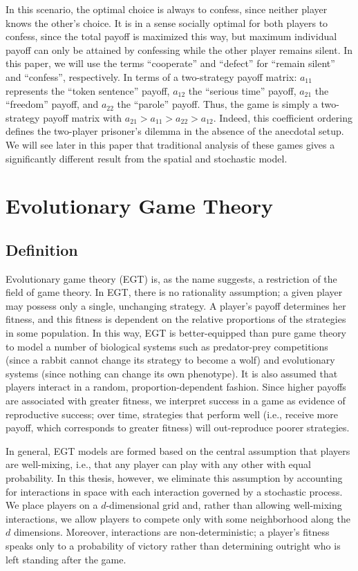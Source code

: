 \documentclass[notitlepage,reqno]{amsart}
\begin{document}
In this scenario, the optimal choice is always to confess, since
neither player knows the other's choice. It is in a sense socially
optimal for both players to confess, since the total payoff is
maximized this way, but maximum individual payoff can only be attained
by confessing while the other player remains silent. In this paper, we will use the terms
``cooperate'' and ``defect'' for ``remain silent'' and ``confess'',
respectively. In terms of a two-strategy payoff matrix: $a_{11}$
represents the ``token sentence'' payoff, $a_{12}$ the ``serious
time'' payoff, $a_{21}$ the ``freedom'' payoff, and $a_{22}$ the
``parole'' payoff. Thus, the game is simply a two-strategy payoff
matrix with $a_{21} > a_{11} > a_{22} > a_{12}$. Indeed, this
coefficient ordering defines the two-player prisoner's dilemma in the absence of the anecdotal setup. We will see later in this paper that traditional analysis of these games gives a significantly different result from the spatial and stochastic model.

\section{Evolutionary Game Theory}
\subsection{Definition}
Evolutionary game theory (EGT) is, as the name suggests, a restriction
of the field of game theory. In EGT, there is no rationality
assumption; a given player may possess only a single, unchanging
strategy. A player's payoff determines her fitness, and this fitness is
dependent on the relative proportions of the strategies in some
population. In this way, EGT is better-equipped than pure game theory
to model a number of biological systems such as predator-prey
competitions (since a rabbit cannot change its strategy to become a
wolf) and evolutionary systems (since nothing can change its own
phenotype). It is also assumed that players interact in a random,
proportion-dependent fashion. Since higher payoffs are associated with
greater fitness, we interpret success in a game as evidence of
reproductive success; over time, strategies that perform well
(i.e., receive more payoff, which corresponds to greater fitness)
will out-reproduce poorer strategies.

In general, EGT models are formed based on the central assumption that
players are well-mixing, i.e., that any player can play with any
other with equal probability. In
this thesis, however, we eliminate this assumption by accounting for interactions in
space with each interaction governed by a stochastic process. We
place players on a $d$-dimensional grid and, rather than allowing
well-mixing interactions, we allow players to compete only with some
neighborhood along the $d$ dimensions. Moreover, interactions are
non-deterministic; a player's fitness speaks only to a probability of
victory rather than determining outright who is left standing after the game.
\end{document}
